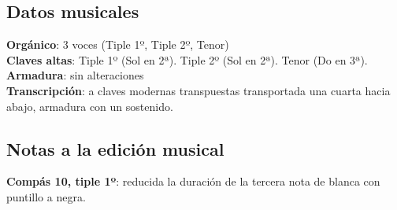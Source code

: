 \subsection*{Datos musicales}
\noindent \textbf{Orgánico}: 3 voces (Tiple 1º, Tiple 2º, Tenor)\\
\textbf{Claves altas}: Tiple 1º (Sol en 2ª). Tiple 2º (Sol en 2ª). Tenor (Do en 3ª).\\
\textbf{Armadura}: sin alteraciones\\
\textbf{Transcripción}: a claves modernas transpuestas transportada una cuarta hacia abajo, armadura con un sostenido.

\subsection*{Notas a la edición musical}

\noindent \textbf{Compás 10, tiple 1º}: reducida la duración de la tercera nota de blanca con puntillo a negra.
